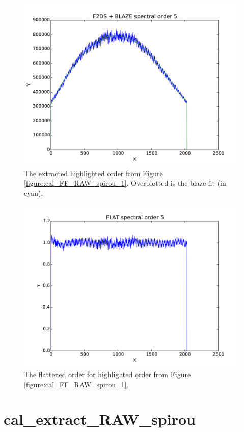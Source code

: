 \begin{figure}
\begin{center}
\includegraphics[width=.8\textwidth]{figures/cal_FF_RAW_spirou_2.pdf}
\caption{The extracted highlighted order from Figure \protect\ref{figure:cal_FF_RAW_spirou_1}. Overplotted is the blaze fit (in cyan). \label{figure:cal_FF_RAW_spirou_2}}
\end{center}
\end{figure}

\begin{figure}
\begin{center}
\includegraphics[width=.8\textwidth]{figures/cal_FF_RAW_spirou_3.pdf}
\caption{The flattened order for highlighted order from Figure \protect\ref{figure:cal_FF_RAW_spirou_1}. \label{figure:cal_FF_RAW_spirou_3}}
\end{center}
\end{figure}

\clearpage
\newpage
\section{cal\_extract\_RAW\_spirou}
\label{section:cal_extract_RAW_spirou}

